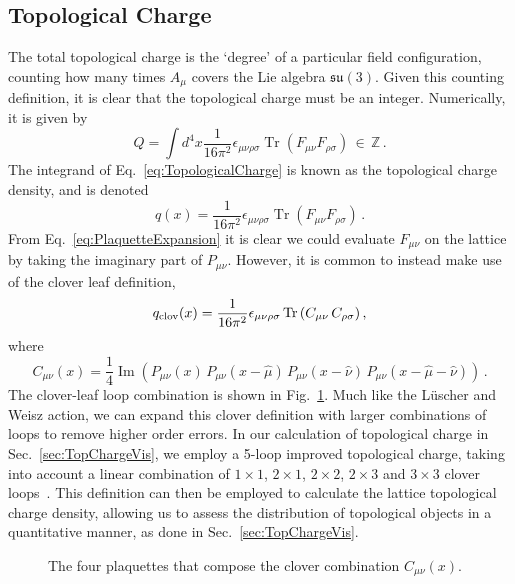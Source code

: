 \subsection{Topological Charge}\label{sec:TopQ}
The total topological charge is the `degree' of a particular field configuration, counting how many times $A_\mu$ covers the Lie algebra $\mathfrak{su}(3)$. Given this counting definition, it is clear that the topological charge must be an integer. Numerically, it is given by~\cite{Alexandrou:2017hqw}
%
\begin{equation}
Q = \int d^4x \frac { 1 } { 16 \pi ^ { 2 } } \epsilon _ { \mu \nu \rho \sigma } \operatorname { Tr } \left( F _ { \mu \nu } F _ { \rho \sigma } \right)\, \in\, \mathbb{Z} \, .
\label{eq:TopologicalCharge}
\end{equation} 
The integrand of Eq.~\ref{eq:TopologicalCharge} is known as the topological charge density, and is denoted
%
\begin{equation}
q(x) = \frac { 1 } { 16 \pi ^ { 2 } } \epsilon _ { \mu \nu \rho \sigma } \operatorname { Tr } \left( F _ { \mu \nu } F _ { \rho \sigma } \right)\, .
\end{equation}
%
From Eq.~\ref{eq:PlaquetteExpansion} it is clear we could evaluate $F_{\mu\nu}$ on the lattice by taking the imaginary part of $P_{\mu\nu}$. However, it is common to instead make use of the clover leaf definition,
%
\begin{equation}
q_\text{clov}(x) = \frac{1}{16\pi^2} \epsilon _ { \mu \nu \rho \sigma } \operatorname{Tr}\left(C_{\mu\nu} \, C_{\rho\sigma}\right),
\end{equation}
%
where
\begin{equation}
C_{\mu\nu}(x) = \frac{1}{4} \operatorname{Im}\left(P_{\mu\nu}(x) \, P_{\mu\nu}(x-\hat{\mu}) \, P_{\mu\nu}(x - \hat{\nu}) \, P_{\mu\nu}(x - \hat{\mu} - \hat{\nu})\right)\, .
\end{equation}
%
The clover-leaf loop combination is shown in Fig.~\ref{fig:Clover}. Much like the L\"uscher and Weisz action, we can expand this clover definition with larger combinations of loops to remove higher order errors. In our calculation of topological charge in Sec.~\ref{sec:TopChargeVis}, we employ a 5-loop improved topological charge, taking into account a linear combination of $1\times 1$, $2\times 1$, $2\times 2$, $2\times 3$ and $3\times 3$ clover loops~\cite{BilsonThompson:2001ca}. This definition can then be employed to calculate the lattice topological charge density, allowing us to assess the distribution of topological objects in a quantitative manner, as done in Sec.~\ref{sec:TopChargeVis}.
%
\begin{figure}[H]
\centering

\caption{\label{fig:Clover}The four plaquettes that compose the clover combination $C_{\mu\nu}(x)$.}
\end{figure}
%

